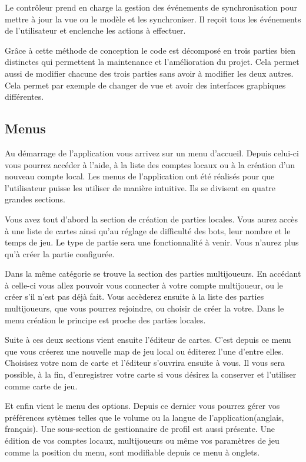 	Le contrôleur prend en charge la gestion des événements de synchronisation pour mettre à jour la vue ou le modèle et les synchroniser. Il reçoit tous les événements de l'utilisateur et enclenche les actions à effectuer.
			
	Grâce à cette méthode de conception le code est décomposé en trois parties bien distinctes qui permettent la maintenance et l'amélioration du projet. Cela permet aussi de modifier chacune des trois parties sans avoir à modifier les deux autres. Cela permet par exemple de changer de vue et avoir des interfaces graphiques différentes.
			
\subsection{Menus}

	Au démarrage de l'application vous arrivez sur un menu d'accueil. Depuis
	celui-ci vous pourrez accéder à l'aide, à la liste des comptes locaux ou à la
	création d'un nouveau compte local.
	Les menus de l'application ont été réalisés pour que l'utilisateur puisse les utiliser de manière intuitive. Ils se divisent en quatre grandes sections.
		
	Vous avez tout d'abord la section de création de parties locales. Vous aurez
	accès à une liste de cartes ainsi qu'au réglage de difficulté des \glspl{bot}, leur
	nombre et le temps de jeu. Le type de partie sera une fonctionnalité à venir.
	Vous n'aurez plus qu'à créer la partie configurée.
		
	Dans la même catégorie se trouve la section des parties multijoueurs. En
	accédant à celle-ci vous allez pouvoir vous connecter à votre compte
	multijoueur, ou le créer s'il n'est pas déjà fait. Vous accèderez ensuite à la liste
	des parties multijoueurs, que vous pourrez rejoindre, ou choisir de créer la
	votre. Dans le menu création le principe est proche des parties locales.
		
	Suite à ces deux sections vient ensuite l'éditeur de cartes. C'est depuis ce
	menu que vous créerez une nouvelle map de jeu local ou éditerez l'une d'entre elles. Choisisez votre nom de carte et l'éditeur
	s'ouvrira ensuite à vous. Il vous sera possible, à la fin, d'enregistrer votre
	carte si vous désirez la conserver et l'utiliser comme carte de jeu.
		
	Et enfin vient le menu des options. Depuis ce dernier vous pourrez gérer vos
	préférences sytèmes telles que le volume ou la langue de
	l'application(anglais, français).
	Une sous-section de gestionnaire de profil est aussi présente. Une édition de vos comptes locaux, multijoueurs ou même
	vos paramètres de jeu comme la position du menu, sont modifiable depuis ce
	menu à onglets.
	
